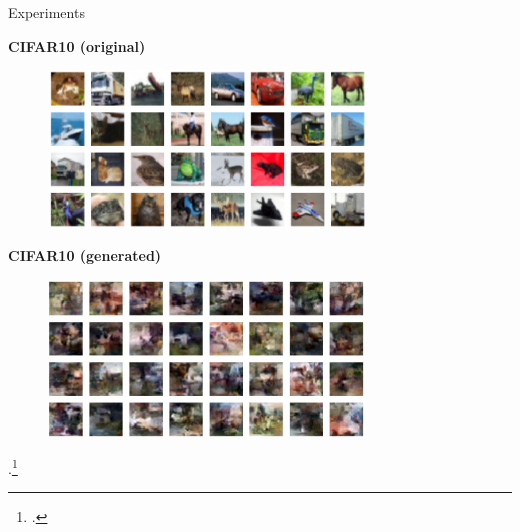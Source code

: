 \documentclass[aspectratio=169, 10pt]{beamer}
\theoremstyle{definition}
\begin{document}
\begin{frame}{Experiments}
  \begin{minipage}[h!]{0.5\textwidth}
    \begin{center}
      \bf CIFAR10 (original)
    \end{center}
    \begin{figure}[h!]
      \centering
      \includegraphics[width=0.75\textwidth]{./pic/cifar10_thermo_original.png}
    \end{figure}
  \end{minipage}\hfill%
  \begin{minipage}[h!]{0.5\textwidth}
    \begin{center}
      \bf CIFAR10 (generated)
    \end{center}
    \begin{figure}[h!]
      \centering
      \includegraphics[width=0.75\textwidth]{./pic/cifar10_thermo_generated.png}
    \end{figure}
  \end{minipage}
  \vfill .\footcite{thermodynamic}
\end{frame}
\end{document}
